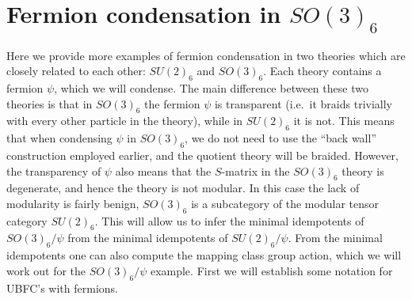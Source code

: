 


\section{Fermion condensation in $SO(3)_6$} \label{so36}

Here we provide more examples of fermion condensation in two theories which are closely related to each other:
$SU(2)_6$ and $SO(3)_6$. 
Each theory contains a fermion $\psi$, which we will condense. 
The main difference between these two theories is that in $SO(3)_6$ the fermion $\psi$ is transparent 
(i.e.\ it braids trivially with every other particle in the theory), while in $SU(2)_6$ it is not. 
This means that when condensing $\psi$ in $SO(3)_6$, we do not need to use the ``back wall'' construction employed earlier,
and the quotient theory will be braided. 
However, the transparency of $\psi$ also means that the $S$-matrix in the $SO(3)_6$ theory is degenerate, 
and hence the theory is not modular. 
In this case the lack of modularity is fairly benign, 
$SO(3)_6$ is a subcategory of the modular tensor category $SU(2)_6$.
This will allow us to infer the minimal idempotents of $SO(3)_6/\psi$ from the minimal idempotents of $SU(2)_6/\psi$.
From the minimal idempotents one can also compute the mapping class group action, which we will work out for the $SO(3)_6/\psi$ example.
First we will establish some notation for UBFC's with fermions.




